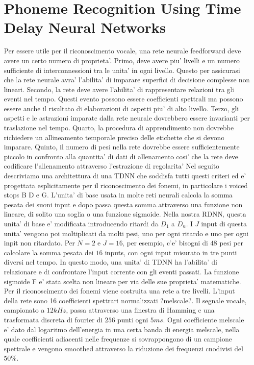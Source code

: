 \chapter{Phoneme Recognition Using Time Delay Neural Networks}
Per essere utile per il riconoscimento vocale, una rete neurale feedforward deve avere un certo numero di proprieta'.
Primo, deve avere piu' livelli e un numero sufficiente di interconnessioni tra le unita' in ogni livello.
Questo per assicurasi che la rete neurale avra' l'abilita' di imparare superfici di decisione complesse non lineari.
Secondo, la rete deve avere l'abilita' di rappresentare relazioni tra gli eventi nel tempo.
Questi evento possono essere coefficienti spettrali ma possono essere anche il risultato di elaborazioni di aspetti piu' di alto livello.
Terzo, gli aspetti e le astrazioni imparate dalla rete neurale dovrebbero essere invarianti per traslazione nel tempo.
Quarto, la procedura di apprendimento non dovrebbe richiedere un allineamento temporale preciso delle etichette che si devono imparare.
Quinto, il numero di pesi nella rete dovrebbe essere sufficientemente piccolo in confronto alla quantita' di dati di allenamento cosi' che la rete deve codificare l'allenamento attraverso l'estrazione di regolarita'
Nel seguito descriviamo una architettura di una TDNN che soddisfa tutti questi criteri ed e' progettata esplicitamente per il riconoscimento dei fonemi, in particolare i voiced stops B D e G.
L'unita' di base usata in molte reti neurali calcola la somma pesata dei suoni input e dopo passa questa somma attraverso una funzione non lineare, di solito una soglia o una funzione sigmoide.
Nella nostra RDNN, questa unita' di base e' modificata introducendo ritardi da $D_{1}$ a $D_{n}$.
I $J$ input di questa unita' vengono poi moltiplicati da molti pesi, uno per ogni ritardo e uno per ogni inpit non ritardato.
Per $N=2$ e $J=16$, per esempio, c'e' bisogni di $48$ pesi per calcolare la somma pesata dei $16$ inputs, con ogni input misurato in tre punti diversi nel tempo.
In questo modo, una unita' di TDNN ha l'abilita' di relazionare e di confrontare l'input corrente con gli eventi passati.
La funzione sigmoide F e' stata scelta non lineare per via delle sue proprieta' matematiche.
Per il riconoscimento dei fonemi viene costruita una rete a tre livelli.
L'input della rete sono 16 coefficienti spettrari normalizzati ?melscale?.
Il segnale vocale, campionato a $12kHz$, passa attraverso una finestra di Hamming e una trasformata discreta di fourier di $256$ punti ogni $5ms$.
Ogni coefficiente melscale e' dato dal logaritmo dell'energia in una certa banda di energia melscale, nella quale coefficienti adiacenti nelle frequenze si sovrappongono di un campione spettrale e vengono smoothed attraverso la riduzione dei frequenzi cnodivisi del $50\%$.
